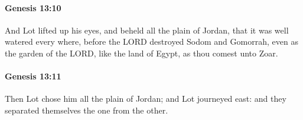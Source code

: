 		\paragraph{Genesis 13:10} %
			\label{GENESIS-13-10}

			And Lot lifted up his eyes, and beheld all the plain of Jordan, that it was well watered every where, before the LORD destroyed Sodom and Gomorrah, even as the garden of the LORD, like the land of Egypt, as thou comest unto Zoar.


		\paragraph{Genesis 13:11} %
			\label{GENESIS-13-11}

			Then Lot chose him all the plain of Jordan; and Lot journeyed east: and they separated themselves the one from the other.


